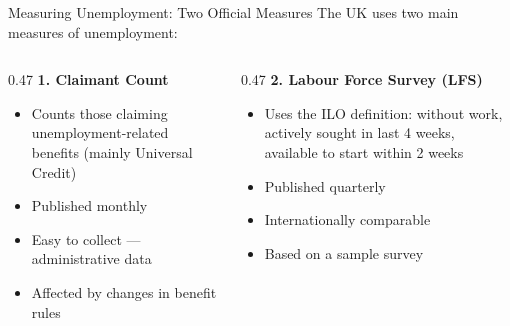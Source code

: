 \documentclass[16pt,aspectratio=169]{beamer}
\begin{document}
\begin{frame}{Measuring Unemployment: Two Official Measures}
    The UK uses two main measures of unemployment:

    \vspace{0.8em}
    \begin{columns}
        \begin{column}{0.47\textwidth}
            \textbf{1. Claimant Count}
            \begin{itemize}
                \item Counts those claiming unemployment-related benefits (mainly Universal Credit)
                \item Published monthly
                \item Easy to collect --- administrative data
                \item Affected by changes in benefit rules
            \end{itemize}
        \end{column}
        \begin{column}{0.47\textwidth}
            \textbf{2. Labour Force Survey (LFS)}
            \begin{itemize}
                \item Uses the ILO definition: without work, actively sought in last 4 weeks, available to start within 2 weeks
                \item Published quarterly
                \item Internationally comparable
                \item Based on a sample survey
            \end{itemize}
        \end{column}
    \end{columns}
\end{frame}
\end{document}
